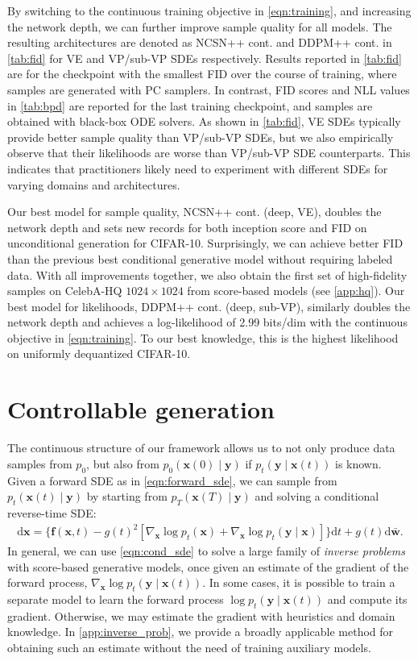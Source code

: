 \documentclass{article} %
\newcommand{\ud}{\mathrm{d}}
\newcommand{\bfx}{\mathbf{x}}
\newcommand{\bfw}{\mathbf{w}}
\newcommand{\bff}{\mathbf{f}}
\newcommand{\bfy}{\mathbf{y}}
\begin{document}
By switching to the continuous training objective in \cref{eqn:training}, and increasing the network depth, we can further improve sample quality for all models. The resulting architectures are denoted as NCSN++ cont. and DDPM++ cont. in \cref{tab:fid} for VE and VP/sub-VP SDEs respectively. Results reported in \cref{tab:fid} are for the checkpoint with the smallest FID over the course of training, where samples are generated with PC samplers. In contrast, FID scores and NLL values in \cref{tab:bpd} are reported for the last training checkpoint, and samples are obtained with black-box ODE solvers. As shown in \cref{tab:fid}, VE SDEs typically provide better sample quality than VP/sub-VP SDEs, but we also empirically observe that their likelihoods are worse than VP/sub-VP SDE counterparts. This indicates that practitioners likely need to experiment with different SDEs for varying domains and architectures.

Our best model for sample quality, NCSN++ cont. (deep, VE), doubles the network depth and sets new records for both inception score and FID on unconditional generation for CIFAR-10. Surprisingly, we can achieve better FID than the previous best conditional generative model without requiring labeled data. With all improvements together, we also obtain the first set of high-fidelity samples on CelebA-HQ $1024\times 1024$ from score-based models (see \cref{app:hq}). Our best model for likelihoods, DDPM++ cont. (deep, sub-VP), similarly doubles the network depth and achieves a log-likelihood of 2.99 bits/dim with the continuous objective in \cref{eqn:training}. To our best knowledge, this is the highest likelihood on uniformly dequantized CIFAR-10.


\section{Controllable generation}
The continuous structure of our framework allows us to not only produce data samples from $p_0$, but also from $p_0(\bfx(0) \mid \bfy)$ if $p_t(\bfy \mid \bfx(t))$ is known. %
Given a forward SDE as in \cref{eqn:forward_sde}, we can sample from $p_t(\bfx(t) \mid \bfy)$ by starting from $p_T(\bfx(T) \mid \bfy)$ and solving a conditional reverse-time SDE:
\begin{align}
\ud \bfx = \{\bff(\bfx, t) - g(t)^2[ \nabla_\bfx  \log p_t(\bfx)+  \nabla_{\bfx}  \log p_t(\bfy \mid \bfx)]\} \ud t + g(t) \ud \bar{\bfw}.\label{eqn:cond_sde}
\end{align}
In general, we can use \cref{eqn:cond_sde} to solve a large family of \emph{inverse problems} with score-based generative models, once given an estimate of the gradient of the forward process, $\nabla_\bfx \log p_t(\bfy \mid \bfx(t) )$. In some cases, it is possible to train a separate model to learn the forward process $\log p_t(\bfy \mid \bfx(t))$ and compute its gradient. Otherwise, we may estimate the gradient with heuristics and domain knowledge. In \cref{app:inverse_prob}, we provide a broadly applicable method for obtaining such an estimate without the need of training auxiliary models.
\end{document}
